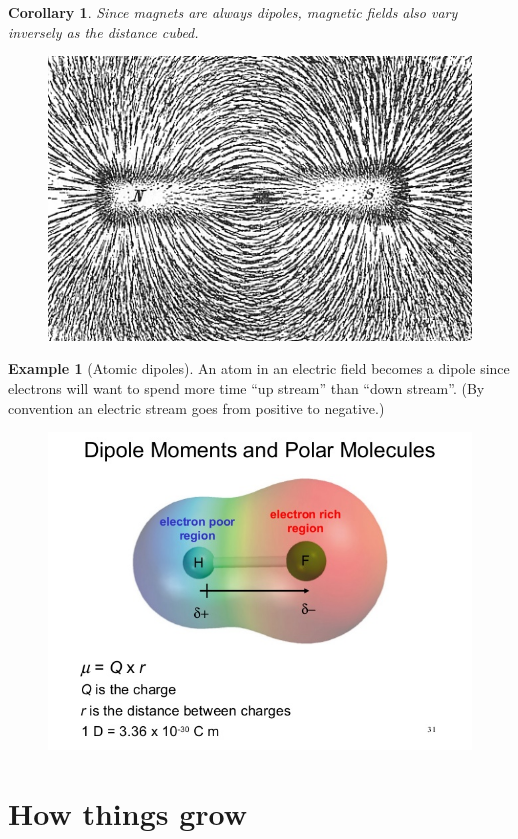 \documentclass[12pt]{article}
\theoremstyle{plain}
\newtheorem{corollary}[theorem]{Corollary}
\theoremstyle{definition}
\newtheorem{example}[theorem]{Example}
\theoremstyle{remark}
\begin{document}
\begin{corollary}
Since magnets are always dipoles, magnetic fields also vary inversely as the distance cubed.
\end{corollary}

\begin{figure}[H]
\centering
\includegraphics[width=.7\textwidth]{Magnet0873}
\end{figure}

\begin{example}[Atomic dipoles]
An atom in an electric field becomes a dipole since electrons will want to spend more time ``up stream'' than ``down stream''. (By convention an electric stream goes from positive to negative.)
\end{example}

\begin{figure}[H]
\centering
\includegraphics[width=.7\textwidth]{chapter-10-chemical-bonding-ii-molecular-geometry-and-hybridization-of-atomic-orbitals-31-638}
\end{figure}

\section{How things grow}
\end{document}
